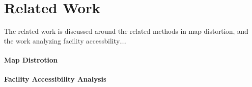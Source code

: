 \section{Related Work}

The related work is discussed around the related methods in map distortion, and the work analyzing facility accessbility....

\paragraph{Map Distrotion}

\paragraph{Facility Accessibility Analysis}






